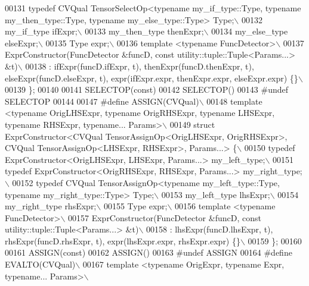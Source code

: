 \begin{DoxyCode}
00131 \textcolor{preprocessor}{  typedef CVQual TensorSelectOp<typename my\_if\_type::Type, typename my\_then\_type::Type, typename
       my\_else\_type::Type> Type;\(\backslash\)}
00132 \textcolor{preprocessor}{  my\_if\_type ifExpr;\(\backslash\)}
00133 \textcolor{preprocessor}{  my\_then\_type thenExpr;\(\backslash\)}
00134 \textcolor{preprocessor}{  my\_else\_type elseExpr;\(\backslash\)}
00135 \textcolor{preprocessor}{  Type expr;\(\backslash\)}
00136 \textcolor{preprocessor}{  template <typename FuncDetector>\(\backslash\)}
00137 \textcolor{preprocessor}{  ExprConstructor(FuncDetector &funcD, const utility::tuple::Tuple<Params...> &t)\(\backslash\)}
00138 \textcolor{preprocessor}{  : ifExpr(funcD.ifExpr, t), thenExpr(funcD.thenExpr, t), elseExpr(funcD.elseExpr, t), expr(ifExpr.expr,
       thenExpr.expr, elseExpr.expr) \{\}\(\backslash\)}
00139 \textcolor{preprocessor}{\};}
00140 
00141 SELECTOP(\textcolor{keyword}{const})
00142 SELECTOP()
00143 \textcolor{preprocessor}{#undef SELECTOP}
00144 
00147 \textcolor{preprocessor}{#define ASSIGN(CVQual)\(\backslash\)}
00148 \textcolor{preprocessor}{template <typename OrigLHSExpr, typename OrigRHSExpr, typename LHSExpr, typename RHSExpr, typename...
       Params>\(\backslash\)}
00149 \textcolor{preprocessor}{struct ExprConstructor<CVQual TensorAssignOp<OrigLHSExpr, OrigRHSExpr>,  CVQual TensorAssignOp<LHSExpr,
       RHSExpr>, Params...> \{\(\backslash\)}
00150 \textcolor{preprocessor}{  typedef ExprConstructor<OrigLHSExpr, LHSExpr, Params...> my\_left\_type;\(\backslash\)}
00151 \textcolor{preprocessor}{  typedef ExprConstructor<OrigRHSExpr, RHSExpr, Params...> my\_right\_type;\(\backslash\)}
00152 \textcolor{preprocessor}{  typedef CVQual TensorAssignOp<typename my\_left\_type::Type, typename my\_right\_type::Type>  Type;\(\backslash\)}
00153 \textcolor{preprocessor}{  my\_left\_type lhsExpr;\(\backslash\)}
00154 \textcolor{preprocessor}{  my\_right\_type rhsExpr;\(\backslash\)}
00155 \textcolor{preprocessor}{  Type expr;\(\backslash\)}
00156 \textcolor{preprocessor}{  template <typename FuncDetector>\(\backslash\)}
00157 \textcolor{preprocessor}{  ExprConstructor(FuncDetector &funcD, const utility::tuple::Tuple<Params...> &t)\(\backslash\)}
00158 \textcolor{preprocessor}{  : lhsExpr(funcD.lhsExpr, t), rhsExpr(funcD.rhsExpr, t), expr(lhsExpr.expr, rhsExpr.expr) \{\}\(\backslash\)}
00159 \textcolor{preprocessor}{ \};}
00160 
00161  ASSIGN(\textcolor{keyword}{const})
00162  ASSIGN()
00163  \textcolor{preprocessor}{#undef ASSIGN}
00164 \textcolor{preprocessor}{#define EVALTO(CVQual)\(\backslash\)}
00167 \textcolor{preprocessor}{template <typename OrigExpr, typename Expr, typename... Params>\(\backslash\)}

\end{DoxyCode}
